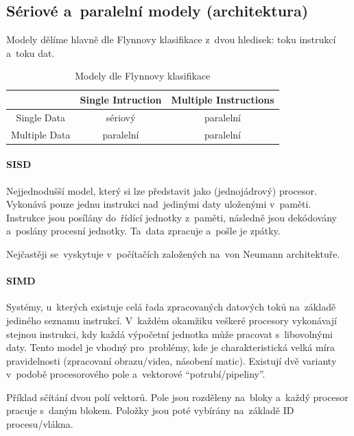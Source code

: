 \subsection{Sériové a~paralelní modely (architektura)}

Modely dělíme hlavně dle Flynnovy klasifikace z~dvou hledisek: toku instrukcí a~toku dat.

\begin{table}[ht]
	\centering
	\caption{Modely dle Flynnovy klasifikace}

	\begin{tabular}{c|cc}
	{}            & Single Intruction & Multiple Instructions \\
	\hline
	Single Data   & sériový           & paralelní             \\
	Multiple Data & paralelní         & paralelní             \\
	\end{tabular}
\end{table}

\paragraph{SISD}

Nejjednodušší model, který si lze představit jako (jednojádrový) procesor. Vykonává pouze jednu instrukci nad~jedinými daty uloženými v~paměti. Instrukce jsou posílány do~řídící jednotky z~paměti, následně jsou dekódovány a~poslány procesní jednotky. Ta~data zpracuje a~pošle je zpátky.

Nejčastěji se~vyskytuje v~počítačích založených na~von Neumann architektuře.

\paragraph{SIMD}

Systémy, u~kterých existuje celá řada zpracovaných datových toků na~základě jediného seznamu instrukcí. V~každém okamžiku veškeré procesory vykonávají stejnou instrukci, kdy každá výpočetní jednotka může pracovat s~libovolnými daty. Tento model je vhodný pro~problémy, kde je charakteristická velká míra pravidelnosti (zpracovaní obrazu/videa, násobení matic). Existují dvě varianty v~podobě procesorového pole a~vektorové \enquote{potrubí/pipeliny}.

Příklad sčítání dvou polí vektorů. Pole jsou rozděleny na~bloky a~každý procesor pracuje s~daným blokem. Položky jsou poté vybírány na~základě ID procesu/vlákna.

